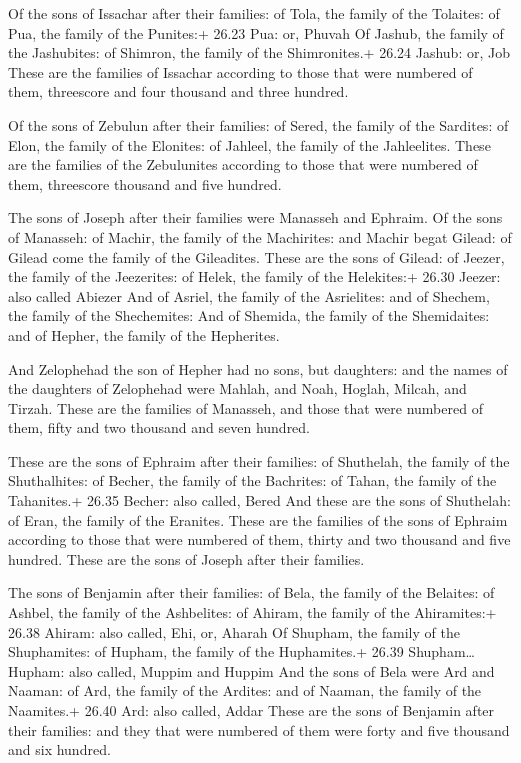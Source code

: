  Of the sons of Issachar after their families: of Tola,
the family of the Tolaites: of Pua, the family of the Punites:+ 26.23
Pua: or, Phuvah  Of Jashub, the family of the Jashubites:
of Shimron, the family of the Shimronites.+ 26.24 Jashub: or, Job
 These are the families of Issachar according to those that
were numbered of them, threescore and four thousand and three hundred.

 Of the sons of Zebulun after their families: of Sered,
the family of the Sardites: of Elon, the family of the Elonites: of
Jahleel, the family of the Jahleelites.  These are the
families of the Zebulunites according to those that were numbered of
them, threescore thousand and five hundred.

 The sons of Joseph after their families were Manasseh
and Ephraim.  Of the sons of Manasseh: of Machir, the
family of the Machirites: and Machir begat Gilead: of Gilead come the
family of the Gileadites.  These are the sons of Gilead: of
Jeezer, the family of the Jeezerites: of Helek, the family of the
Helekites:+ 26.30 Jeezer: also called Abiezer  And of
Asriel, the family of the Asrielites: and of Shechem, the family of the
Shechemites:  And of Shemida, the family of the
Shemidaites: and of Hepher, the family of the Hepherites.

 And Zelophehad the son of Hepher had no sons, but
daughters: and the names of the daughters of Zelophehad were Mahlah, and
Noah, Hoglah, Milcah, and Tirzah.  These are the families
of Manasseh, and those that were numbered of them, fifty and two
thousand and seven hundred.

 These are the sons of Ephraim after their families: of
Shuthelah, the family of the Shuthalhites: of Becher, the family of the
Bachrites: of Tahan, the family of the Tahanites.+ 26.35 Becher: also
called, Bered  And these are the sons of Shuthelah: of
Eran, the family of the Eranites.  These are the families
of the sons of Ephraim according to those that were numbered of them,
thirty and two thousand and five hundred. These are the sons of Joseph
after their families.

 The sons of Benjamin after their families: of Bela, the
family of the Belaites: of Ashbel, the family of the Ashbelites: of
Ahiram, the family of the Ahiramites:+ 26.38 Ahiram: also called, Ehi,
or, Aharah  Of Shupham, the family of the Shuphamites: of
Hupham, the family of the Huphamites.+ 26.39 Shupham\ldots Hupham: also
called, Muppim and Huppim  And the sons of Bela were Ard
and Naaman: of Ard, the family of the Ardites: and of Naaman, the family
of the Naamites.+ 26.40 Ard: also called, Addar  These are
the sons of Benjamin after their families: and they that were numbered
of them were forty and five thousand and six hundred.

